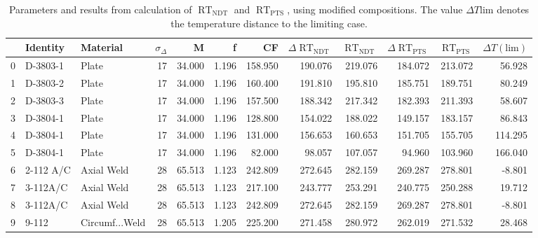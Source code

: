 \documentclass{article}
\begin{document}
    
    \begin{table}
    \caption{Parameters and results from calculation of $\operatorname{RT}_{\operatorname{NDT}}$ and $\operatorname{RT}_{\operatorname{PTS}}$, using modified compositions. The value $\Delta T\text{lim}$ denotes the temperature distance to the limiting case.}
    \label{table:rt_values_modified}
    
    \begin{tabular}{lllrrrrrrrrr}
        \toprule
        {} &                                  Identity &              Material &  $\sigma_\Delta$ &      M &    f &     CF &  $\Delta\operatorname{RT}_{\operatorname{NDT}}$ &  $\operatorname{RT}_{\operatorname{NDT}}$  & $\Delta\operatorname{RT}_{\operatorname{PTS}}$  &  $\operatorname{RT}_{\operatorname{PTS}}$ & $\Delta T(\text{lim})$ \\
       \midrule
0 &   D-3803-1 &           Plate &   17 & 34.000 & 1.196 & 158.950 &  190.076 & 219.076 &  184.072 & 213.072 &   56.928 \\
1 &   D-3803-2 &           Plate &   17 & 34.000 & 1.196 & 160.400 &  191.810 & 195.810 &  185.751 & 189.751 &   80.249 \\
2 &   D-3803-3 &           Plate &   17 & 34.000 & 1.196 & 157.500 &  188.342 & 217.342 &  182.393 & 211.393 &   58.607 \\
3 &   D-3804-1 &           Plate &   17 & 34.000 & 1.196 & 128.800 &  154.022 & 188.022 &  149.157 & 183.157 &   86.843 \\
4 &   D-3804-1 &           Plate &   17 & 34.000 & 1.196 & 131.000 &  156.653 & 160.653 &  151.705 & 155.705 &  114.295 \\
5 &   D-3804-1 &           Plate &   17 & 34.000 & 1.196 &  82.000 &   98.057 & 107.057 &   94.960 & 103.960 &  166.040 \\
6 &  2-112 A/C &      Axial Weld &   28 & 65.513 & 1.123 & 242.809 &  272.645 & 282.159 &  269.287 & 278.801 &   -8.801 \\
7 &   3-112A/C &      Axial Weld &   28 & 65.513 & 1.123 & 217.100 &  243.777 & 253.291 &  240.775 & 250.288 &   19.712 \\
8 &   3-112A/C &      Axial Weld &   28 & 65.513 & 1.123 & 242.809 &  272.645 & 282.159 &  269.287 & 278.801 &   -8.801 \\
9 &      9-112 &  Circumf...Weld &   28 & 65.513 & 1.205 & 225.200 &  271.458 & 280.972 &  262.019 & 271.532 &   28.468 \\
\bottomrule
        \end{tabular}
    \end{table}
        
\end{document}

